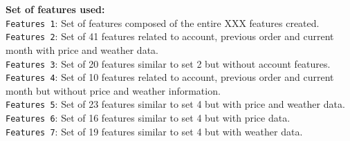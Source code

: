 \textbf{Set of features used:}\\
\texttt{Features 1}: Set of features composed of the entire XXX features created. \\
\texttt{Features 2}: Set of 41 features related to account, previous order and current month with price and weather data. \\
\texttt{Features 3}: Set of 20 features similar to set 2 but without account features. \\
\texttt{Features 4}: Set of 10 features related to account, previous order and current month but without price and weather information. \\
\texttt{Features 5}: Set of 23 features similar to set 4 but with price and weather data. \\
\texttt{Features 6}: Set of 16 features similar to set 4 but with price data. \\
\texttt{Features 7}: Set of 19 features similar to set 4 but with weather data. \\

